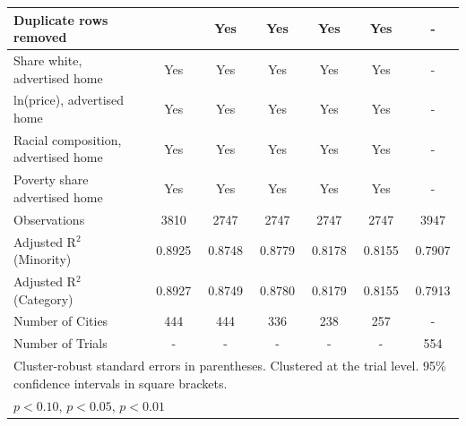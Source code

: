 \begin{table}[htbp]
{\begin{tabular}{l*{6}{c}}
Duplicate rows removed &  & Yes & Yes & Yes & Yes & - \\
\midrule
Share white, advertised home  & Yes & Yes & Yes & Yes & Yes & - \\
ln(price), advertised home  & Yes & Yes & Yes & Yes & Yes & - \\
Racial composition, advertised home & Yes & Yes & Yes & Yes & Yes & - \\
Poverty share advertised home & Yes & Yes & Yes & Yes & Yes & - \\
Observations & 3810 & 2747 & 2747 & 2747 & 2747 & 3947 \\
Adjusted R$^2$ (Minority) & 0.8925 & 0.8748 & 0.8779 & 0.8178 & 0.8155 & 0.7907 \\
Adjusted R$^2$ (Category) & 0.8927 & 0.8749 & 0.8780 & 0.8179 & 0.8155 & 0.7913 \\
Number of Cities & 444 & 444 & 336 & 238 & 257 & - \\
Number of Trials & - & - & - & - & - & 554 \\
\bottomrule
\multicolumn{7}{l}{\footnotesize Cluster-robust standard errors in parentheses. Clustered at the trial level. 95\% confidence intervals in square brackets.}\\
\multicolumn{7}{l}{\footnotesize \sym{*} \(p<0.10\), \sym{**} \(p<0.05\), \sym{***} \(p<0.01\)}\\
\end{tabular}
}
\end{table}
